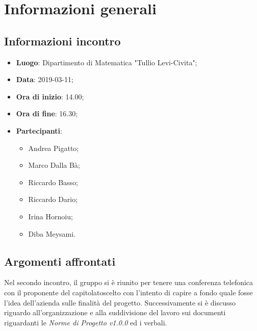 \section{Informazioni generali}

\subsection{Informazioni incontro}
\begin{itemize}
	\item \textbf{Luogo}: Dipartimento di Matematica "Tullio Levi-Civita";
	\item \textbf{Data}: 2019-03-11;
	\item \textbf{Ora di inizio}: 14.00;
	\item \textbf{Ora di fine}: 16.30;
	\item \textbf{Partecipanti}: 
	\begin{itemize}
		\item Andrea Pigatto;
		\item Marco Dalla Bà;
		\item Riccardo Basso;
		\item Riccardo Dario;
		\item Irina Hornoiu;
		\item Diba Meysami.
	\end{itemize}
\end{itemize}

\subsection{Argomenti affrontati}
Nel secondo incontro, il gruppo si è riunito per tenere una conferenza telefonica con il proponente del capitolato\glosp scelto
con l'intento di capire a fondo quale fosse l'idea dell'azienda sulle finalità del progetto. 
Successivamente si è discusso riguardo all'organizzazione e alla suddivisione del lavoro sui documenti riguardanti le \textit{Norme di Progetto v1.0.0} ed i verbali.

